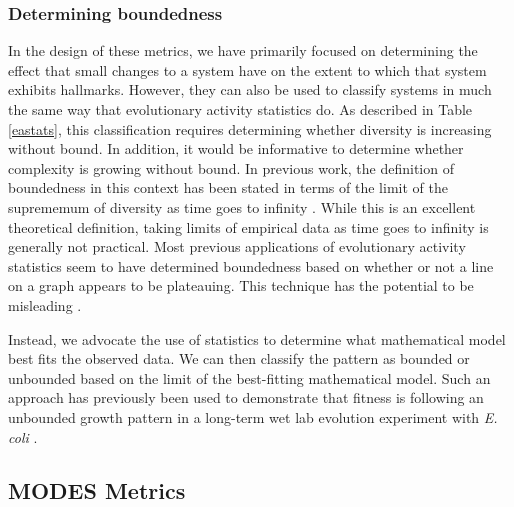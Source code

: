 \documentclass[letterpaper]{article}
\begin{document}
\subsubsection{Determining boundedness}

In the design of these metrics, we have primarily focused on determining the effect that small changes to a system have on the extent to which that system exhibits hallmarks. However, they can also be used to classify systems in much the same way that evolutionary activity statistics do. As described in Table \ref{eastats}, this classification requires determining whether diversity is increasing without bound. In addition, it would be informative to determine whether complexity is growing without bound. In previous work, the definition of boundedness in this context has been stated in terms of the limit of the suprememum of diversity as time goes to infinity \citep{bedau_classification_1998}. While this is an excellent theoretical definition, taking limits of empirical data as time goes to infinity is generally not practical. Most previous applications of evolutionary activity statistics seem to have determined boundedness based on whether or not a line on a graph appears to be plateauing. This technique has the potential to be misleading \citep{wiser_boundedness_2018}.

Instead, we advocate the use of statistics to determine what mathematical model best fits the observed data. We can then classify the pattern as bounded or unbounded based on the limit of the best-fitting mathematical model. Such an approach has previously been used to demonstrate that fitness is following an unbounded growth pattern in a long-term wet lab evolution experiment with \textit{E. coli} \citep{wiser_long-term_2013, lenski_sustained_2015}.

\subsection{MODES Metrics}
\end{document}
